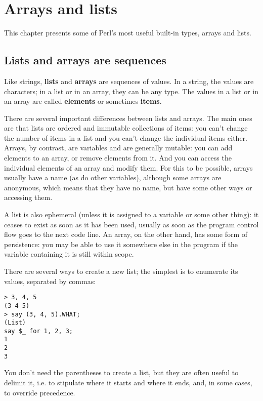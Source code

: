 

\chapter{Arrays and lists}
\label{arrays}

This chapter presents some of Perl's most useful built-in types, 
arrays and lists.


\section{Lists and arrays are sequences}
\label{sequence}

Like strings, {\bf lists} and {\bf arrays} are sequences of 
values.  In a string, the values are characters; in a list or
in an array, they can be any type.  The values in a list or 
in an array are called {\bf elements} or sometimes {\bf items}.

There are several important differences between lists and arrays. The main ones 
are that lists are ordered and immutable collections of items: 
you can't change the number of items in a list and you can't 
change the individual items either. Arrays, by contrast, are 
variables and are generally mutable: you can add elements 
to an array, or remove elements from it. And you can access 
the individual elements of an array and modify them. For this 
to be possible, arrays usually have a name (as do other variables), 
although some arrays are anonymous, which means that they 
have no name, but have some other ways or accessing them.

A list is also ephemeral (unless it is assigned 
to a variable or some other thing): it ceases to exist as 
soon as it has been used, usually as soon as the program 
control flow goes to the next code line. An array, on the 
other hand, has some form of persistence: you may be able to 
use it somewhere else in the program if the variable 
containing it is still within scope.

There are several ways to create a new list; the simplest is 
to enumerate its values, separated by commas:

\begin{verbatim}
> 3, 4, 5
(3 4 5)
> say (3, 4, 5).WHAT;
(List)
say $_ for 1, 2, 3;
1
2
3
\end{verbatim}
%

You don't need the parentheses to create a list, but they are 
often useful to delimit it, i.e. to stipulate where 
it starts and where it ends, and, in some cases, to override 
precedence.

